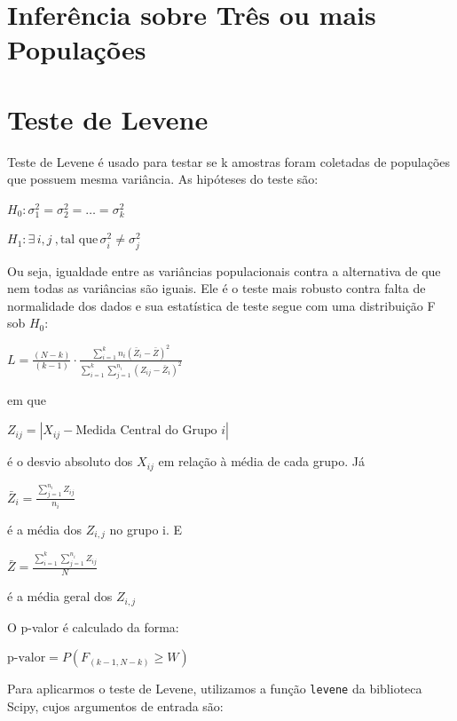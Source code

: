 \documentclass[
  letterpaper,
  DIV=11,
  numbers=noendperiod]{scrreprt}
\begin{document}

\hypertarget{inferuxeancia-sobre-truxeas-ou-mais-populauxe7uxf5es}{%
\chapter{Inferência sobre Três ou mais
Populações}\label{inferuxeancia-sobre-truxeas-ou-mais-populauxe7uxf5es}}


\hypertarget{teste-de-levene}{%
\chapter{Teste de Levene}\label{teste-de-levene}}

Teste de Levene é usado para testar se k amostras foram coletadas de
populações que possuem mesma variância. As hipóteses do teste são:

\(H_0: \sigma_1^2 = \sigma_2^2 = \dots = \sigma_k^2\)

\(H_1: \exists \, i, j \ , \text{tal que} \, \sigma_i^2 \neq \sigma_j^2\)

Ou seja, igualdade entre as variâncias populacionais contra a
alternativa de que nem todas as variâncias são iguais. Ele é o teste
mais robusto contra falta de normalidade dos dados e sua estatística de
teste segue com uma distribuição F sob \(H_{0}\):

\(L = \frac{(N - k)}{(k - 1)} \cdot \frac{\sum_{i=1}^{k} n_i (\bar{Z}_i - \bar{Z})^2}{\sum_{i=1}^{k} \sum_{j=1}^{n_i} (Z_{ij} - \bar{Z}_i)^2}\)

em que

\(Z_{ij} = |X_{ij} - \text{Medida Central do Grupo } i|\)

é o desvio absoluto dos \(X_{ij}\) em relação à média de cada grupo. Já

\(\bar{Z}_i = \frac{\sum_{j=1}^{n_i} Z_{ij}}{n_i}\)

é a média dos \(Z_{i,j}\) no grupo i. E

\(\bar{Z} = \frac{\sum_{i=1}^k \sum_{j=1}^{n_i} Z_{ij}}{N}\)

é a média geral dos \(Z_{i,j}\)

O p-valor é calculado da forma:

\(\text{p-valor} = P(F_{(k-1, N-k)} \geq W)\)

Para aplicarmos o teste de Levene, utilizamos a função \texttt{levene}
da biblioteca Scipy, cujos argumentos de entrada são:
\end{document}
